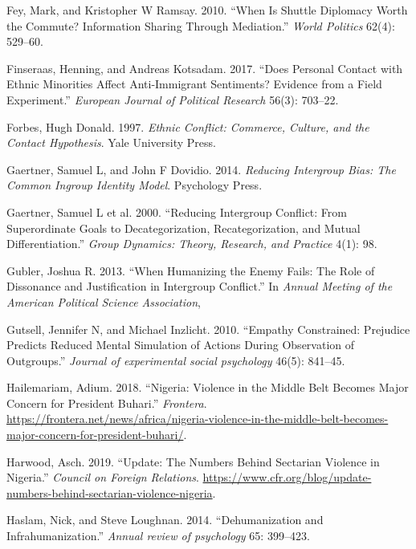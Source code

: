 \documentclass[11pt]{article}
\begin{document}
\leavevmode\hypertarget{ref-fey2010shuttle}{}%
Fey, Mark, and Kristopher W Ramsay. 2010. ``When Is Shuttle Diplomacy
Worth the Commute? Information Sharing Through Mediation.'' \emph{World
Politics} 62(4): 529--60.

\leavevmode\hypertarget{ref-finseraas2017does}{}%
Finseraas, Henning, and Andreas Kotsadam. 2017. ``Does Personal Contact
with Ethnic Minorities Affect Anti-Immigrant Sentiments? Evidence from a
Field Experiment.'' \emph{European Journal of Political Research} 56(3):
703--22.

\leavevmode\hypertarget{ref-forbes1997ethnic}{}%
Forbes, Hugh Donald. 1997. \emph{Ethnic Conflict: Commerce, Culture, and
the Contact Hypothesis}. Yale University Press.

\leavevmode\hypertarget{ref-gaertner2014reducing}{}%
Gaertner, Samuel L, and John F Dovidio. 2014. \emph{Reducing Intergroup
Bias: The Common Ingroup Identity Model}. Psychology Press.

\leavevmode\hypertarget{ref-gaertner2000reducing}{}%
Gaertner, Samuel L et al. 2000. ``Reducing Intergroup Conflict: From
Superordinate Goals to Decategorization, Recategorization, and Mutual
Differentiation.'' \emph{Group Dynamics: Theory, Research, and Practice}
4(1): 98.

\leavevmode\hypertarget{ref-gubler2013humanizing}{}%
Gubler, Joshua R. 2013. ``When Humanizing the Enemy Fails: The Role of
Dissonance and Justification in Intergroup Conflict.'' In \emph{Annual
Meeting of the American Political Science Association},

\leavevmode\hypertarget{ref-gutsell2010empathy}{}%
Gutsell, Jennifer N, and Michael Inzlicht. 2010. ``Empathy Constrained:
Prejudice Predicts Reduced Mental Simulation of Actions During
Observation of Outgroups.'' \emph{Journal of experimental social
psychology} 46(5): 841--45.

\leavevmode\hypertarget{ref-frontera2018nigeria}{}%
Hailemariam, Adium. 2018. ``Nigeria: Violence in the Middle Belt Becomes
Major Concern for President Buhari.'' \emph{Frontera}.
\url{https://frontera.net/news/africa/nigeria-violence-in-the-middle-belt-becomes-major-concern-for-president-buhari/}.

\leavevmode\hypertarget{ref-council2019nigeria}{}%
Harwood, Asch. 2019. ``Update: The Numbers Behind Sectarian Violence in
Nigeria.'' \emph{Council on Foreign Relations}.
\url{https://www.cfr.org/blog/update-numbers-behind-sectarian-violence-nigeria}.

\leavevmode\hypertarget{ref-haslam2014dehumanization}{}%
Haslam, Nick, and Steve Loughnan. 2014. ``Dehumanization and
Infrahumanization.'' \emph{Annual review of psychology} 65: 399--423.
\end{document}
